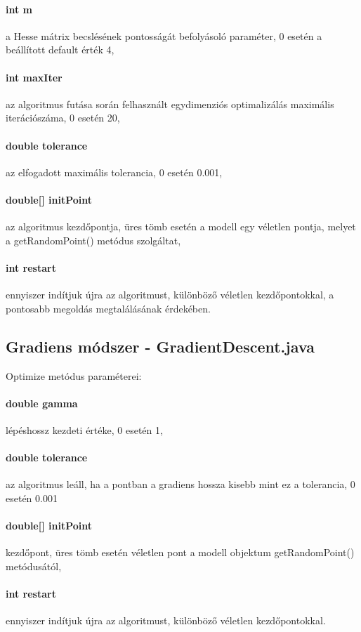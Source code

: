 \paragraph{int m} a Hesse mátrix becslésének pontosságát befolyásoló paraméter, 0 esetén a beállított default érték 4,
\paragraph{int maxIter} az algoritmus futása során felhasznált egydimenziós optimalizálás maximális iterációszáma, 0 esetén 20, 
\paragraph{double tolerance} az elfogadott maximális tolerancia, 0 esetén 0.001,
\paragraph{double[] initPoint} az algoritmus kezdőpontja, üres tömb esetén a modell egy véletlen pontja, melyet a getRandomPoint() metódus szolgáltat,
\paragraph{int restart} ennyiszer indítjuk újra az algoritmust, különböző véletlen kezdőpontokkal, a pontosabb megoldás megtalálásának érdekében.

\subsection{Gradiens módszer - GradientDescent.java}
Optimize metódus paraméterei:
\paragraph{double gamma} lépéshossz kezdeti értéke, 0 esetén 1,
\paragraph{double tolerance} az algoritmus leáll, ha a pontban a gradiens hossza kisebb mint ez a tolerancia, 0 esetén 0.001
\paragraph{double[] initPoint} kezdőpont, üres tömb esetén véletlen pont a modell objektum getRandomPoint() metódusától,
\paragraph{int restart} ennyiszer indítjuk újra az algoritmust, különböző véletlen kezdőpontokkal.

